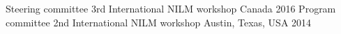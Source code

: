 \begin{cvhonors}
  \cvhonor
    {Steering committee}
    {3rd International NILM workshop}
    {Canada}
    {2016}
  \cvhonor
    {Program committee}
    {2nd International NILM workshop}
    {Austin, Texas, USA}
    {2014}
\end{cvhonors}

